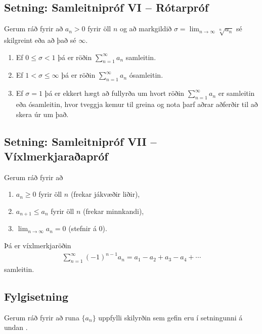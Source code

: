 \documentclass[b5paper,11pt,icelandic]{sphinxmanual}
\begin{document}
\subsection{Setning: Samleitnipróf VI – Rótarpróf}
\label{kafli09:setning-samleitniprof-vi-rotarprof}
Gerum ráð fyrir að \(a_n>0\) fyrir öll \(n\) og að markgildið
\(\sigma=\lim_{n\rightarrow\infty}\sqrt[n]{a_n}\) sé skilgreint eða
að það sé \(\infty\).
\begin{enumerate}
\item {} 
Ef \(0\leq\sigma<1\) þá er röðin \(\sum_{n=1}^\infty a_n\)
samleitin.

\item {} 
Ef \(1<\sigma\leq \infty\) þá er röðin
\(\sum_{n=1}^\infty a_n\) ósamleitin.

\item {} 
Ef \(\sigma=1\) þá er ekkert hægt að fullyrða um hvort röðin
\(\sum_{n=1}^\infty a_n\) er samleitin eða ósamleitin, hvor
tveggja kemur til greina og nota þarf aðrar aðferðir til að skera
úr um það.

\end{enumerate}


\subsection{Setning: Samleitnipróf VII – Víxlmerkjaraðapróf}
\label{kafli09:setning-samleitniprof-vii-vixlmerkjaraaprof}\label{kafli09:vixlmerkjaprof}
Gerum ráð fyrir að
\begin{enumerate}
\item {} 
\(a_n\geq 0\) fyrir öll \(n\) (frekar jákvæðir liðir),

\item {} 
\(a_{n+1}\leq a_n\) fyrir öll \(n\) (frekar minnkandi),

\item {} 
\(\lim_{n\rightarrow\infty} a_n=0\) (stefnir á 0).

\end{enumerate}

Þá er víxlmerkjaröðin
\begin{equation*}
\begin{split}\sum_{n=1}^\infty (-1)^{n-1}a_n=a_1-a_2+a_3-a_4+\cdots\end{split}
\end{equation*}
samleitin.


\subsection{Fylgisetning}
\label{kafli09:id11}
Gerum ráð fyrir að runa \(\{a_n\}\) uppfylli skilyrðin sem gefin eru
í setningunni á undan {\hyperref[kafli09:vixlmerkjaprof]{}}.
\end{document}

